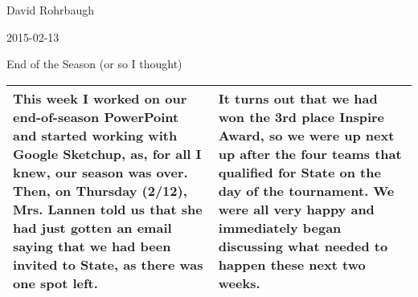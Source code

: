 David Rohrbaugh

2015-02-13

End of the Season (or so I thought)

\begin{tabular}{|p{5cm}|p{5cm}|}
 \hline
 This week I worked on our end-of-season PowerPoint and started working with Google Sketchup, as, for all I knew, our season was over. Then, on Thursday (2/12), Mrs. Lannen told us that she had just gotten an email saying that we had been invited to State, as there was one spot left.
 &
  It turns out that we had won the 3rd place Inspire Award, so we were up next up after the four teams that qualified for State on the day of the tournament. We were all very happy and immediately began discussing what needed to happen these next two weeks.
 \\
 \hline
\end{tabular}

